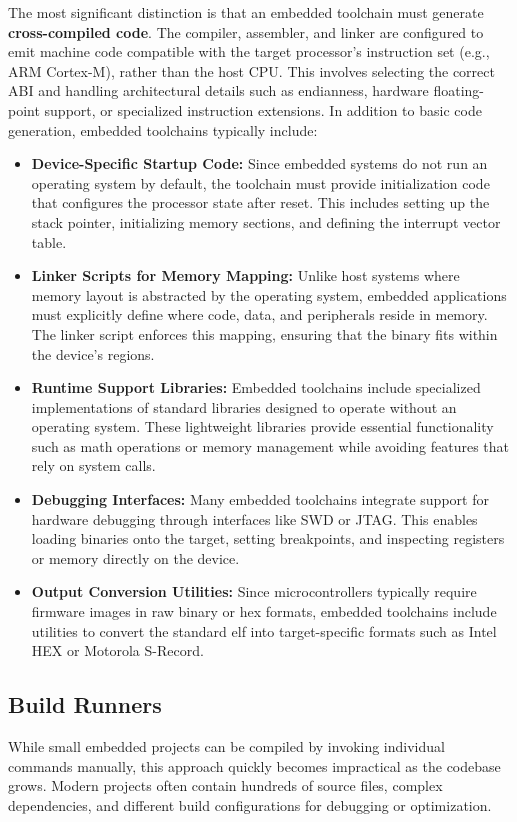 The most significant distinction is that an embedded toolchain must generate \textbf{cross-compiled code}.
The compiler, assembler, and linker are configured to emit machine code compatible with the target processor's instruction set (e.g., ARM Cortex-M), rather than the host CPU.
This involves selecting the correct ABI and handling architectural details such as endianness, hardware floating-point support, or specialized instruction extensions.
In addition to basic code generation, embedded toolchains typically include:
\begin{itemize}
	\item \textbf{Device-Specific Startup Code:} Since embedded systems do not run an operating system by default, the toolchain must provide initialization code that configures the processor state after reset.
	This includes setting up the stack pointer, initializing memory sections, and defining the interrupt vector table.

	\item \textbf{Linker Scripts for Memory Mapping:} Unlike host systems where memory layout is abstracted by the operating system, embedded applications must explicitly define where code, data, and peripherals reside in memory.
	The linker script enforces this mapping, ensuring that the binary fits within the device’s regions.

	\item \textbf{Runtime Support Libraries:} Embedded toolchains include specialized implementations of standard libraries designed to operate without an operating system.
	These lightweight libraries provide essential functionality such as math operations or memory management while avoiding features that rely on system calls.

	\item \textbf{Debugging Interfaces:} Many embedded toolchains integrate support for hardware debugging through interfaces like SWD or JTAG.
	This enables loading binaries onto the target, setting breakpoints, and inspecting registers or memory directly on the device.

	\item \textbf{Output Conversion Utilities:} Since microcontrollers typically require firmware images in raw binary or hex formats, embedded toolchains include utilities to convert the standard elf into target-specific formats such as Intel HEX or Motorola S-Record.
\end{itemize}

\subsection{Build Runners}
While small embedded projects can be compiled by invoking individual commands manually, this approach quickly becomes impractical as the codebase grows.
Modern projects often contain hundreds of source files, complex dependencies, and different build configurations for debugging or optimization.

